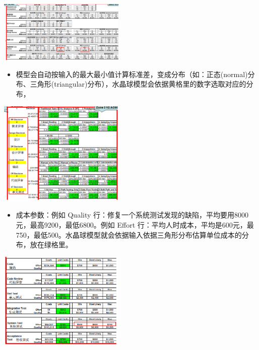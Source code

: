 
\includegraphics[width=6cm]{微信截图_20211027011246.png}

\begin{itemize}
\tightlist
\item
  模型会自动按输入的最大最小值计算标准差，变成分布（如：正态(normal)分布、三角形(triangular)分布），水晶球模型会依据黄格里的数字选取对应的分布，
\end{itemize}


\includegraphics[width=6cm]{微信截图_20231027140307.png}

\begin{itemize}
\tightlist
\item
  成本参数：例如 Quality 行：修复一个系统测试发现的缺陷，平均要用8000元，最高9200，最低6800。例如 Effort 行：平均人时成本，平均是600元，最750，最低500。水晶球模型就会依据输入依据三角形分布估算单位成本的分布，放在绿格里。
\end{itemize}


\includegraphics[width=6cm]{微信截图_20231027140341.png}

